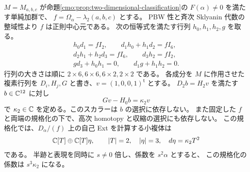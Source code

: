 \begin{lemma}[行列係数の長さ三分解と高次作用の抽出]
$M=M_{a,b,c}$ が命題\ref{cmo:prop:two-dimensional-classification}の
$F(\alpha)\ne0$ を満たす単純加群で、
$f=\Omega_\alpha-\lambda_2(a,b,c)$ とする。
PBW 性と斉次 Sklyanin 代数の整域性より $f$ は正則中心元である。
次の恒等式を満たす行列 $h_0,h_1,h_2,g$ を取る。
\begin{equation}\label{cmo:eq:two-dimensional-homotopies}
 \begin{gathered}
 h_0d_1=fI_2,\qquad d_1h_0+h_1d_2=fI_6,\\
 d_2h_1+h_2d_3=fI_6,\qquad d_3h_2=fI_2,\\
 gd_3+h_0h_1=0,\qquad d_1g+h_1h_2=0.
 \end{gathered}
\end{equation}
行列の大きさは順に $2\times6,6\times6,6\times2,2\times2$ である。
各成分を $M$ に作用させた複素行列を
$D_i,H_j,G$ と書き、$v=(1,0,0,1)^{\mathsf t}$ とする。
$D_2b=H_2v$ を満たす $b\in\mathbb C^{12}$ に対し
\begin{equation}\label{cmo:eq:two-dimensional-kappa-extraction}
 Gv-H_0b=\kappa_2v
\end{equation}
で $\kappa_2\in\mathbb C$ を定める。このスカラーは $b$ の選択に依存しない。
また固定した $f$ と両端の規格化の下で、高次 homotopy と収縮の選択にも依存しない。
この規格化では、$D_\alpha/(f)$ 上の自己 Ext を計算する小複体は
\begin{equation}\label{cmo:eq:two-dimensional-effective}
 \mathbb C[T]\oplus\mathbb C[T]\eta,\qquad |T|=2,\quad|\eta|=3,\quad
 d\eta=\kappa_2T^2
\end{equation}
である。
半跡と表現を同時に $s\ne0$ 倍し、係数を $s^2\alpha$ とすると、
この規格化の係数は $s^3\kappa_2$ になる。
\end{lemma}


